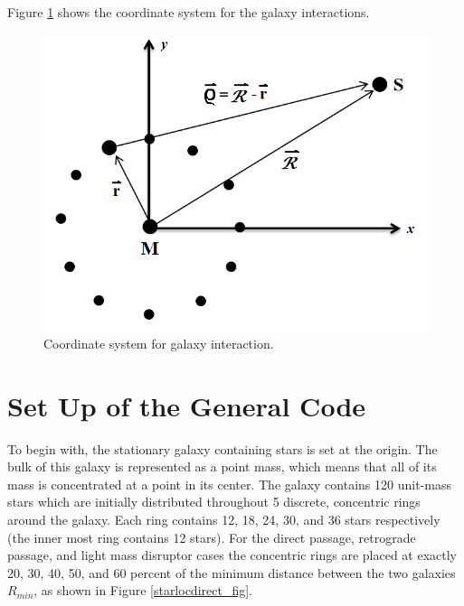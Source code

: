 \documentclass[11pt]{article}
\begin{document}
Figure \ref{coords_fig} shows the coordinate system for the galaxy interactions.

\begin{figure}[h!]
\centering
\includegraphics[width=5in]{Figure2.png}
\caption{Coordinate system for galaxy interaction.}
\label{coords_fig}
\end{figure}

\section{Set Up of the General Code}\label{Setup_sec}

To begin with, the stationary galaxy containing stars is set at the origin.  The bulk of this galaxy is represented as a point mass, which means that all of its mass is concentrated at a point in its center.  The galaxy contains 120 unit-mass stars which are initially distributed throughout 5 discrete, concentric rings around the galaxy.  Each ring contains 12, 18, 24, 30, and 36 stars respectively (the inner most ring contains 12 stars).  For the direct passage, retrograde passage, and light mass disruptor cases the concentric rings are placed at exactly 20, 30, 40, 50, and 60 percent of the minimum distance between the two galaxies $R_{min}$, as shown in Figure \ref{starlocdirect_fig}. 
\end{document}
